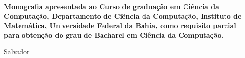 

\begin{titlepage}
 \vfill
 \begin{center}
   {\large \uppercase{ \bf{ \meunome\ } } } \\[7cm]
   {\Huge \uppercase{ \bf{ \meutitulo\ } } }\\[1cm]
   \vfill
   \hspace{.45\textwidth} %
   \begin{minipage}{.5\textwidth}
     \begin{espacosimples}
       \bf{
	Monografia apresentada ao Curso de graduação em Ciência da Computação, 
	Departamento de Ciência da Computação, Instituto de Matemática, Universidade Federal da 
	Bahia, como requisito parcial para obtenção do grau de Bacharel em Ciência da Computação. \\ 
       }      
     \end{espacosimples}
     \begin{espacosimples}    
       \meuorientador
       \newline
       \meucoorientador
     \end{espacosimples}
   \end{minipage}
   \vfill
   Salvador \\
   \meuano
 \end{center}
\end{titlepage}

